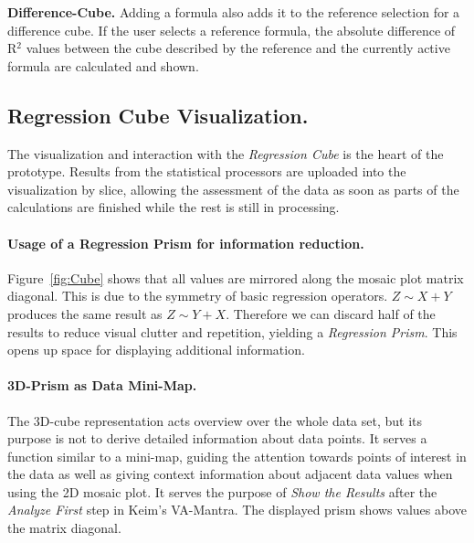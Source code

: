 \documentclass[journal]{style/vgtc} 			          %
\newcommand{\com}[1]{\textcolor{orange}{\uline{#1}}}
\begin{document}
\textbf{Difference-Cube.}
Adding a formula also adds it to the reference selection for a difference cube.
If the user selects a reference formula, the absolute difference of R$^2$ values between the cube described by the reference and the currently active formula are calculated and shown.


\subsection{Regression Cube Visualization.}
The visualization and interaction with the \emph{Regression Cube} is the heart of the prototype.
Results from the statistical processors are uploaded into the visualization by slice, allowing the assessment of the data as soon as parts of the calculations are finished while the rest is still in processing.

\paragraph{Usage of a Regression Prism for information reduction.}
Figure~\ref{fig:Cube} shows that all values are mirrored along the mosaic plot matrix diagonal.
This is due to the symmetry of basic regression operators.
$Z \sim X + Y$ produces the same result as $Z \sim Y + X$.
Therefore we can discard half of the results to reduce visual clutter and repetition, yielding a \emph{Regression Prism}.
This opens up space for displaying additional information.

\paragraph{3D-Prism as Data Mini-Map.}
The 3D-cube representation acts overview over the whole data set, but its purpose is not to derive detailed information about data points.
It serves a function similar to a mini-map, guiding the attention towards points of interest in the data as well as giving context information about adjacent data values when using the 2D mosaic plot.
It serves the purpose of \emph{Show the Results} after the \emph{Analyze First} step in Keim's VA-Mantra.
The displayed prism shows values above the matrix diagonal.
\\\\
\end{document}
